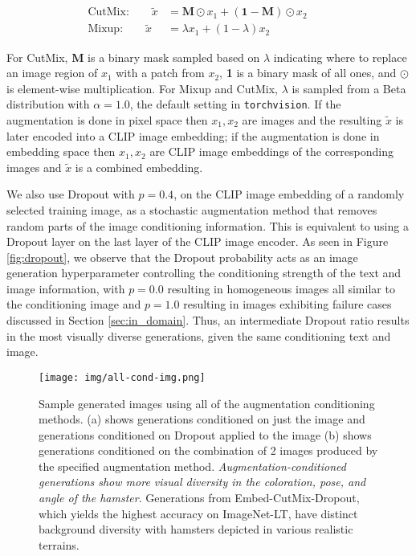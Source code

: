 \begin{align*}
    \text{CutMix:} \qquad \tilde{x} &= \mathbf{M} \odot x_1 + (\mathbf{1}- \mathbf{M}) \odot x_2\qquad \\ 
    \text{Mixup:} \qquad \tilde{x} &= \lambda x_1 + (1 - \lambda) x_2\qquad 
\end{align*}
\vspace{-0.5cm}

For CutMix, \textbf{M} is a binary mask sampled based on $\lambda$ indicating where to replace an image region of $x_1$ with a patch from $x_2$, \textbf{1} is a binary mask of all ones, and $\odot$ is element-wise multiplication.
For Mixup and CutMix, $\lambda$ is sampled from a Beta distribution with $\alpha=1.0$, the default setting in \texttt{torchvision}.
If the augmentation is done in pixel space then $x_1, x_2$ are images and the resulting $\tilde{x}$ is later encoded into a CLIP image embedding; if the augmentation is done in embedding space then $x_1, x_2$ are CLIP image embeddings of the corresponding images and $\tilde{x}$ is a combined embedding.

We also use Dropout \citep{dropout} with $p=0.4$, on the CLIP image embedding of a randomly selected training image, as a stochastic augmentation method that removes random parts of the image conditioning information. 
This is equivalent to using a Dropout layer on the last layer of the CLIP image encoder.
As seen in Figure \ref{fig:dropout}, we observe that the Dropout probability acts as an image generation hyperparameter controlling the conditioning strength of the text and image information, with $p=0.0$ resulting in homogeneous images all similar to the conditioning image and $p=1.0$ resulting in images exhibiting failure cases discussed in Section \ref{sec:in_domain}. Thus, an intermediate Dropout ratio results in the most visually diverse generations, given the same conditioning text and image. 

\begin{figure}[t]
    \centering
    \texttt{[image: img/all-cond-img.png]}
    \caption{Sample generated images using all of the augmentation conditioning methods. (a) shows generations conditioned on just the image and generations conditioned on Dropout applied to the image (b) shows generations conditioned on the combination of 2 images produced by the specified augmentation method. \textit{Augmentation-conditioned generations show more visual diversity in the coloration, pose, and angle of the hamster}.
    Generations from Embed-CutMix-Dropout, which yields the highest accuracy on ImageNet-LT, have distinct background diversity with hamsters depicted in various realistic terrains.} 
    \label{fig:all_conds}
\end{figure}

